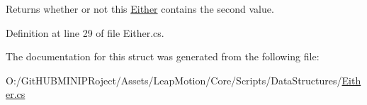 Returns whether or not this \mbox{\hyperlink{struct_leap_1_1_unity_1_1_either}{Either}} contains the second value. 



Definition at line 29 of file Either.\+cs.



The documentation for this struct was generated from the following file\+:\begin{DoxyCompactItemize}
\item 
O\+:/\+Git\+H\+U\+B\+M\+I\+N\+I\+P\+Roject/\+Assets/\+Leap\+Motion/\+Core/\+Scripts/\+Data\+Structures/\mbox{\hyperlink{_either_8cs}{Either.\+cs}}\end{DoxyCompactItemize}
